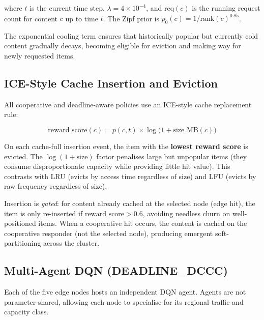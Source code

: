 \documentclass[12pt,a4paper]{report}
\begin{document}
where $t$ is the current time step, $\lambda = 4 \times 10^{-4}$, and $\text{req}(c)$ is
the running request count for content $c$ up to time $t$. The Zipf prior is
$p_0(c) = 1/\text{rank}(c)^{0.85}$.

The exponential cooling term ensures that historically popular but currently cold content
gradually decays, becoming eligible for eviction and making way for newly requested items.

\subsection{ICE-Style Cache Insertion and Eviction}

All cooperative and deadline-aware policies use an ICE-style cache replacement rule:

\begin{equation}
  \text{reward\_score}(c) = p(c,t) \times \log\!\bigl(1 + \text{size\_MB}(c)\bigr)
  \label{eq:ice}
\end{equation}

On each cache-full insertion event, the item with the \textbf{lowest reward score} is
evicted. The $\log(1 + \text{size})$ factor penalises large but unpopular items (they consume
disproportionate capacity while providing little hit value). This contrasts with LRU (evicts
by access time regardless of size) and LFU (evicts by raw frequency regardless of size).

Insertion is \emph{gated}: for content already cached at the selected node (edge hit), the
item is only re-inserted if $\text{reward\_score} > 0.6$, avoiding needless churn on
well-positioned items. When a cooperative hit occurs, the content is cached on the cooperative
responder (not the selected node), producing emergent soft-partitioning across the cluster.

\subsection{Multi-Agent DQN (DEADLINE\_DCCC)}

Each of the five edge nodes hosts an independent DQN agent. Agents are not
parameter-shared, allowing each node to specialise for its regional traffic and capacity class.
\end{document}
